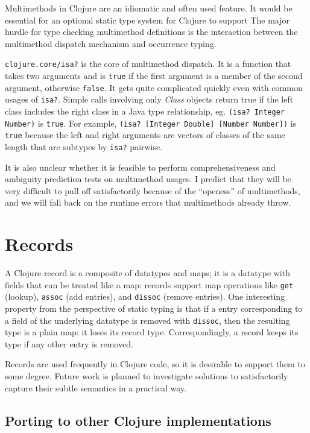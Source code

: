Multimethods in Clojure are an idiomatic and often used feature.
It would be essential for an optional static type system for Clojure to support
The major hurdle for type checking multimethod definitions is the
interaction between the multimethod dispatch mechanism and occurrence typing.

\lstinline|clojure.core/isa?| is the core of multimethod dispatch.
It is a function that takes two arguments and is \lstinline|true| if
the first argument is a member of the second argument, otherwise \lstinline|false|.
It gets quite complicated quickly even with common usages of \lstinline|isa?|.
Simple calls involving only \emph{Class} objects return true if the left class
includes the right class in a Java type relationship, eg. \lstinline|(isa? Integer Number)| is \lstinline|true|.
For example, \lstinline|(isa? [Integer Double] [Number Number])| is \lstinline|true|
because the left and right arguments are vectors of classes of the same length
that are subtypes by \lstinline|isa?| pairwise.

It is also unclear whether it is feasible to perform comprehensiveness and
ambiguity prediction tests on multimethod usages. I predict that they will be
very difficult to pull off satisfactorily because of the ``openess'' of multimethods,
and we will fall back on the runtime errors that multimethods already throw.

\section{Records}

A Clojure record is a composite of datatypes and maps; it is a datatype
with fields that can be treated like a map: records support map operations like \lstinline|get| (lookup),
\lstinline|assoc| (add entries), and \lstinline|dissoc| (remove entries).
One interesting property from the perspective of static typing is that if
a entry corresponding to a field of the underlying datatype is removed
with \lstinline|dissoc|, then the resulting type is a plain map: it loses
its record type.
Correspondingly, a record keeps its type if any other entry is removed.

Records are used frequently in Clojure code, so it is desirable
to support them to some degree. Future work is planned to investigate solutions
to satisfactorily capture their subtle semantics in a practical way.

\subsection{Porting to other Clojure implementations}

